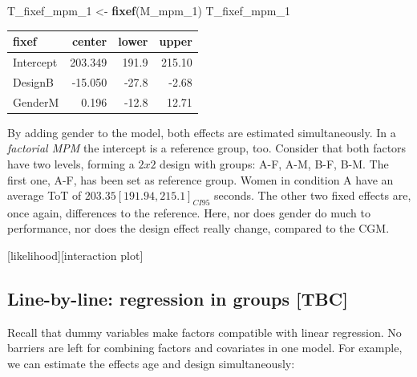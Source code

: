 \documentclass[]{svmono}
\newenvironment{Shaded}{\begin{snugshade}}{\end{snugshade}}
\newcommand{\KeywordTok}[1]{\textcolor[rgb]{0.13,0.29,0.53}{\textbf{#1}}}
\newcommand{\DataTypeTok}[1]{\textcolor[rgb]{0.13,0.29,0.53}{#1}}
\newcommand{\DecValTok}[1]{\textcolor[rgb]{0.00,0.00,0.81}{#1}}
\newcommand{\StringTok}[1]{\textcolor[rgb]{0.31,0.60,0.02}{#1}}
\newcommand{\OperatorTok}[1]{\textcolor[rgb]{0.81,0.36,0.00}{\textbf{#1}}}
\newcommand{\NormalTok}[1]{#1}
\theoremstyle{definition}
\theoremstyle{definition}
\theoremstyle{definition}
\theoremstyle{remark}
\begin{document}
\begin{Shaded}
\begin{Highlighting}[]
\NormalTok{T_fixef_mpm_}\DecValTok{1}\NormalTok{ <-}\StringTok{ }\KeywordTok{fixef}\NormalTok{(M_mpm_}\DecValTok{1}\NormalTok{)}
\NormalTok{T_fixef_mpm_}\DecValTok{1}
\end{Highlighting}
\end{Shaded}

\begin{longtable}[]{@{}lrrr@{}}
\toprule
fixef & center & lower & upper\tabularnewline
\midrule
\endhead
Intercept & 203.349 & 191.9 & 215.10\tabularnewline
DesignB & -15.050 & -27.8 & -2.68\tabularnewline
GenderM & 0.196 & -12.8 & 12.71\tabularnewline
\bottomrule
\end{longtable}

By adding gender to the model, both effects are estimated
simultaneously. In a \emph{factorial MPM} the intercept is a reference
group, too. Consider that both factors have two levels, forming a
\(2x 2\) design with groups: A-F, A-M, B-F, B-M. The first one, A-F, has
been set as reference group. Women in condition A have an average ToT of
\(203.35 [191.94, 215.1]_{CI95}\) seconds. The other two fixed effects
are, once again, differences to the reference. Here, nor does gender do
much to performance, nor does the design effect really change, compared
to the CGM.

{[}likelihood{]}{[}interaction plot{]}

\subsection{Line-by-line: regression in groups
{[}TBC{]}}\label{line-by-line}

Recall that dummy variables make factors compatible with linear
regression. No barriers are left for combining factors and covariates in
one model. For example, we can estimate the effects age and design
simultaneously:

\begin{Shaded}
\end{Shaded}
\end{document}

